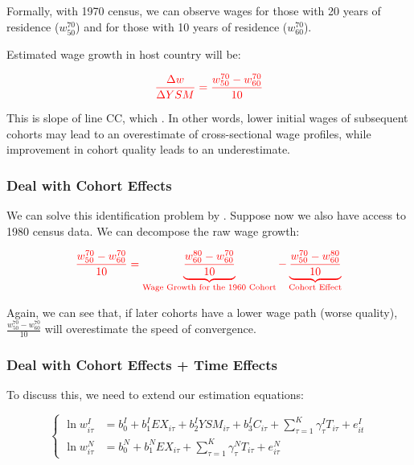             Formally, with 1970 census, we can observe wages for those with 20 years of residence ($w_{50}^{70}$) and for those with 10 years of residence ($w_{60}^{70}$).
            
            Estimated wage growth in host country will be:
            
            \[\color{red} \frac{\Delta w}{\Delta YSM} = \frac{w_{50}^{70}-w_{60}^{70}}{10}\]
            
            This is slope of line CC, which . In other words, lower initial wages of subsequent cohorts may lead to an overestimate of cross-sectional wage profiles, while improvement in cohort quality leads to an underestimate.

        \subsubsection{Deal with Cohort Effects}

            We can solve this identification problem by . Suppose now we also have access to 1980 census data. We can decompose the raw wage growth:

            \begin{equation*}
                \color{red}
                \frac{w_{50}^{70} - w_{60}^{70}}{10} = \underbrace{\frac{w_{60}^{80} - w_{60}^{70}}{10}}_{\text{Wage Growth for the 1960 Cohort}} - \underbrace{\frac{w_{50}^{70} - w_{60}^{80}}{10}}_{\text{Cohort Effect}}
            \end{equation*}

            Again, we can see that, if later cohorts have a lower wage path (worse quality), $\frac{w_{50}^{70} - w_{60}^{70}}{10}$ will overestimate the speed of convergence.
        
        \subsubsection{Deal with Cohort Effects + Time Effects}

            To discuss this, we need to extend our estimation equations:

            \[
            \begin{cases}
            \ln w_{i\tau}^I & = b_{0}^I+b_{1}^IEX_{i\tau} + b_{2}^IYSM_{i\tau} + b_{3}^IC_{i\tau} + \sum_{\tau=1}^{K}\gamma_{\tau}^IT_{i\tau} + e_{it}^I \\
            \ln w_{i\tau}^N & = b_{0}^N+b_{1}^NEX_{i\tau} + \sum_{\tau=1}^{K}\gamma_{\tau}^NT_{i\tau}+ e_{i\tau}^N
            \end{cases}
            \]

